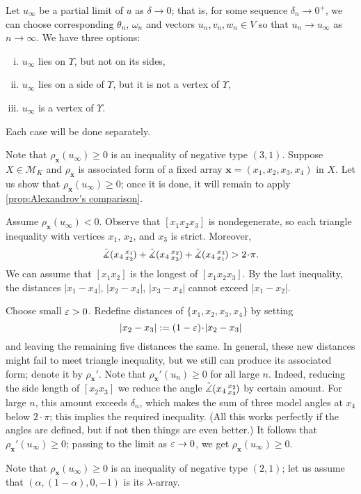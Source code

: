 \documentclass[a4paper,10pt]{article}
\begin{document}
Let $u_\infty$ be a partial limit of $u$ as $\delta\to 0$;
that is, for some sequence $\delta_n\to 0^+$, we can choose corresponding $\theta_n$, $\omega_n$ and vectors $u_n,v_n,w_n\in V$
so that $u_n\to u_\infty$ as $n\to\infty$.
We have three options:
\begin{enumerate}[(i)]
\item\label{in} $u_\infty$ lies on $\Upsilon$, but not on its sides,
\item\label{side}$u_\infty$ lies on a side of $\Upsilon$, but it is not a vertex of $\Upsilon$,
\item\label{vertex} $u_\infty$ is a vertex of $\Upsilon$.
\end{enumerate}
Each case will be done separately.

Note that $\rho_{\bm{x}}(u_\infty)\ge0$ is an inequality of negative type $(3,1)$.
Suppose $X\in \mathcal{M}_K$ and $\rho_{\bm{x}}$ is associated form of a fixed array $\bm{x}=(x_1, x_2, x_3, x_4)$ in $X$.
Let us show that $\rho_{\bm{x}}(u_\infty)\ge0$;
once it is done, it will remain to apply \ref{prop:Alexandrov's comparison}.

Assume $\rho_{\bm{x}}(u_\infty)<0$.
Observe that $[x_1x_2x_3]$ is nondegenerate, so each triangle inequality with vertices $x_1$, $x_2$, and $x_3$ is strict.
Moreover,
\[\angk{x_4}{x_1}{x_2}+\angk{x_4}{x_2}{x_3}+\angk{x_4}{x_3}{x_1}>2\cdot\pi.\]
We can assume that $[x_1x_2]$ is the longest of $[x_1x_2x_3]$.
By the last inequality, the distances $|x_1-x_4|$, $|x_2-x_4|$, $|x_3-x_4|$ cannot exceed $|x_1-x_2|$.

Choose small $\varepsilon>0$.
Redefine distances of $\{x_1,x_2,x_3,x_4\}$ by setting
\[|x_2-x_3|\z{\mathrel{:=}}(1-\eps)\cdot|x_2-x_3|\]
and leaving the remaining five distances the same.
In general, these new distances might fail to meet triangle inequality, but we still can produce its associated form;
denote it by $\rho_{\bm{x}}'$.
Note that $\rho_{\bm{x}}'(u_n)\ge0$ for all large $n$.
Indeed, reducing the side length of $[x_2x_3]$ we reduce the angle $\tilde\measuredangle(x_4\,{}^{x_2}_{x_3}\hspace{-0.2ex})$ by certain amount.
For large $n$, this amount exceeds $\delta_n$, which makes the sum of three model angles at $x_4$ below $2\cdot \pi$; this implies the required inequality.
(All this works perfectly if the angles are defined, but if not then things are even better.)
It follows that $\rho_{\bm{x}}'(u_\infty)\ge0$;
passing to the limit as $\varepsilon\to 0$, we get $\rho_{\bm{x}}(u_\infty)\ge0$.

Note that $\rho_{\bm{x}}(u_\infty)\ge0$ is an inequality of negative type $(2,1)$;
let us assume that $(\alpha,(1-\alpha), 0,-1)$ is its $\lambda$-array.
\end{document}
